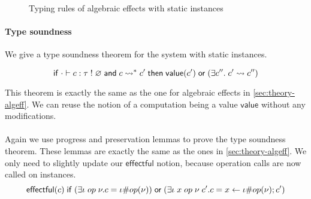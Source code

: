 {\begin{figure}
\caption{Typing rules of algebraic effects with static instances}
\centering
{}
\end{figure}

\paragraph{Type soundness}
We give a type soundness theorem for the system with static instances.

\begin{theorem}
\[
	\mathsf{if}\;
		\cdot \vdash c : \tau \; ! \; \varnothing
		\;\mathsf{and}\;
		c \rightsquigarrow^* c'
	\;\mathsf{then}\;
		\mathsf{value}(c')
		\;\mathsf{or}\;
		(\exists c''.\; c' \rightsquigarrow c'')
\]
\end{theorem}

This theorem is exactly the same as the one for algebraic effects in \cref{sec:theory-algeff}.
We can reuse the notion of a computation being a value $\mathsf{value}$ without any modifications.
\\\\
Again we use progress and preservation lemmas to prove the type soundness theorem.
These lemmas are exactly the same as the ones in \cref{sec:theory-algeff}.
We only need to slightly update our $\mathsf{effectful}$ notion, because operation calls are now called on instances.
\[ \mathsf{effectful}(c) \;\mathsf{if}\; (\exists \iota \; op \; \nu. c = \iota \# op(\nu)) \;\mathsf{or}\; (\exists \iota \; x \; op \; \nu \; c'. c = x \leftarrow \iota \# op(\nu) ; c') \]

}
